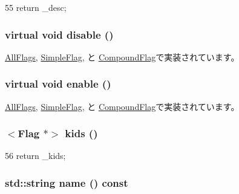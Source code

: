 \begin{DoxyCode}
55 { return _desc; }
\end{DoxyCode}
\hypertarget{classDebug_1_1Flag_ac79a817a699d8fb54e52bf6895db1b0d}{
\subsubsection[{disable}]{\setlength{\rightskip}{0pt plus 5cm}virtual void disable ()}}
\label{classDebug_1_1Flag_ac79a817a699d8fb54e52bf6895db1b0d}


\hyperlink{structDebug_1_1AllFlags_a8cfbbe53c1cf6e3054736daea3044c0f}{AllFlags}, \hyperlink{classDebug_1_1SimpleFlag_a8cfbbe53c1cf6e3054736daea3044c0f}{SimpleFlag}, と \hyperlink{classDebug_1_1CompoundFlag_a8cfbbe53c1cf6e3054736daea3044c0f}{CompoundFlag}で実装されています。\hypertarget{classDebug_1_1Flag_ad1c349e10e4417179f5eb3cb519670b5}{
\subsubsection[{enable}]{\setlength{\rightskip}{0pt plus 5cm}virtual void enable ()}}
\label{classDebug_1_1Flag_ad1c349e10e4417179f5eb3cb519670b5}


\hyperlink{structDebug_1_1AllFlags_a486f22824bd83c5308a0d70ffac6f758}{AllFlags}, \hyperlink{classDebug_1_1SimpleFlag_a486f22824bd83c5308a0d70ffac6f758}{SimpleFlag}, と \hyperlink{classDebug_1_1CompoundFlag_a486f22824bd83c5308a0d70ffac6f758}{CompoundFlag}で実装されています。\hypertarget{classDebug_1_1Flag_af0576ea1093429654e13aa2c3df88c75}{
\subsubsection[{kids}]{$<${\bf Flag} $\ast$$>$ kids ()}}
\label{classDebug_1_1Flag_af0576ea1093429654e13aa2c3df88c75}



\begin{DoxyCode}
56 { return _kids; }
\end{DoxyCode}
\hypertarget{classDebug_1_1Flag_a37627d5d5bba7f4a8690c71c2ab3cb07}{
\subsubsection[{name}]{\setlength{\rightskip}{0pt plus 5cm}std::string name () const}}
\label{classDebug_1_1Flag_a37627d5d5bba7f4a8690c71c2ab3cb07}



